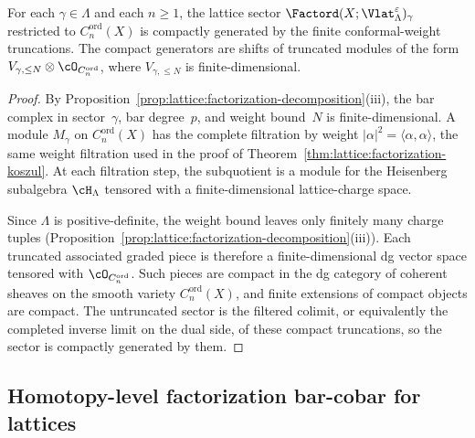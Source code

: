\begin{proposition}
\label{prop:lattice:sectorwise-compactness}
For each $\gamma \in \Lambda$ and each $n \geq 1$, the lattice
sector $\Factord(X; \Vlat_\Lambda^\varepsilon)_\gamma$ restricted
to $C_n^{\mathrm{ord}}(X)$ is compactly generated by the
finite conformal-weight truncations. The compact generators are
shifts of truncated modules of the form
$V_{\gamma,\leq N}\otimes\cO_{C_n^{\mathrm{ord}}}$, where
$V_{\gamma,\leq N}$ is finite-dimensional.
\end{proposition}

\begin{proof}
By Proposition~\ref{prop:lattice:factorization-decomposition}(iii),
the bar complex in sector~$\gamma$, bar degree~$p$, and weight
bound~$N$ is finite-dimensional. A module $M_\gamma$ on
$C_n^{\mathrm{ord}}(X)$ has the complete filtration by weight
$|\alpha|^2 = \langle\alpha,\alpha\rangle$, the same weight
filtration used in the proof of
Theorem~\ref{thm:lattice:factorization-koszul}. At each
filtration step, the subquotient is a module for the Heisenberg
subalgebra $\cH_\Lambda$ tensored with a finite-dimensional
lattice-charge space.

Since $\Lambda$ is positive-definite, the weight bound leaves only
finitely many charge tuples
\textup{(}Proposition~\ref{prop:lattice:factorization-decomposition}(iii)\textup{)}.
Each truncated associated graded piece is therefore a
finite-dimensional dg vector space tensored with
$\cO_{C_n^{\mathrm{ord}}}$. Such pieces are compact in the dg
category of coherent sheaves on the smooth variety
$C_n^{\mathrm{ord}}(X)$, and finite extensions of compact objects are
compact. The untruncated sector is the filtered colimit, or
equivalently the completed inverse limit on the dual side, of these
compact truncations, so the sector is compactly generated by them.
\end{proof}


\subsection{Homotopy-level factorization bar-cobar for lattices}

